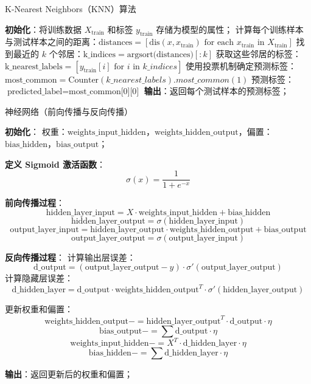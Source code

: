 \documentclass{article}
\begin{document}
\begin{algorithm}
\caption{K-Nearest Neighbors（KNN）算法}
\textbf{初始化}：将训练数据 $X_{\text{train}}$ 和标签 $y_{\text{train}}$ 存储为模型的属性；
 {
    计算每个训练样本与测试样本之间的距离：$\text{distances} = [\text{dis}(x, x_{\text{train}}) \text{ for each } x_{\text{train}} \text{ in } X_{\text{train}}]$\;
    找到最近的 $k$ 个邻居：$\text{k\_indices} = \text{argsort(distances)}[:k]$\;
    获取这些邻居的标签：$\text{k\_nearest\_labels} = [y_{\text{train}}[i] \text{ for } i \text{ in } k\_indices]$\;
    使用投票机制确定预测标签：$\text{most\_common} = \text{Counter}(k\_nearest\_labels).most\_common(1)$\;
    预测标签：$\text{predicted\_label} = \text{most\_common[0][0]}$\;
}
\textbf{输出}：返回每个测试样本的预测标签；
\end{algorithm}

\begin{algorithm}
\caption{神经网络（前向传播与反向传播）}
\textbf{初始化}：
    权重：$\text{weights\_input\_hidden}$，$\text{weights\_hidden\_output}$，偏置：$\text{bias\_hidden}$，$\text{bias\_output}$；

\textbf{定义 Sigmoid 激活函数}：
\[
\sigma(x) = \frac{1}{1 + e^{-x}}
\]

\textbf{前向传播过程}：
\[
\text{hidden\_layer\_input} = X \cdot \text{weights\_input\_hidden} + \text{bias\_hidden}
\]
\[
\text{hidden\_layer\_output} = \sigma(\text{hidden\_layer\_input})
\]
\[
\text{output\_layer\_input} = \text{hidden\_layer\_output} \cdot \text{weights\_hidden\_output} + \text{bias\_output}
\]
\[
\text{output\_layer\_output} = \sigma(\text{output\_layer\_input})
\]

\textbf{反向传播过程}：
计算输出层误差：
\[
\text{d\_output} = (\text{output\_layer\_output} - y) \cdot \sigma'(\text{output\_layer\_output})
\]
计算隐藏层误差：
\[
\text{d\_hidden\_layer} = \text{d\_output} \cdot \text{weights\_hidden\_output}^T \cdot \sigma'(\text{hidden\_layer\_output})
\]

更新权重和偏置：
\[
\text{weights\_hidden\_output} -= \text{hidden\_layer\_output}^T \cdot \text{d\_output} \cdot \eta
\]
\[
\text{bias\_output} -= \sum \text{d\_output} \cdot \eta
\]
\[
\text{weights\_input\_hidden} -= X^T \cdot \text{d\_hidden\_layer} \cdot \eta
\]
\[
\text{bias\_hidden} -= \sum \text{d\_hidden\_layer} \cdot \eta
\]

\textbf{输出}：返回更新后的权重和偏置；
\end{algorithm}
\end{document}
